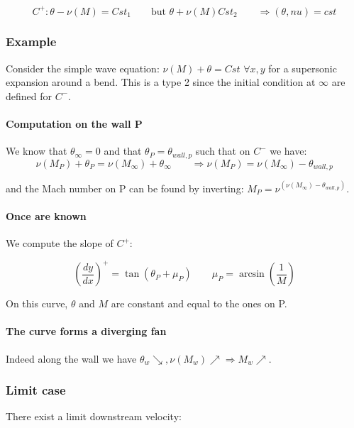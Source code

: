 	\begin{equation}
	C^+ : \theta - \nu (M) = {Cst}_1 \qquad \mbox{but } \theta + \nu(M) {Cst}_2\qquad \Rightarrow (\theta  , nu)= cst
	\end{equation}
	
\subsubsection{Example}
	Consider the simple wave equation: $\nu (M) +\theta = Cst$ $\forall x,y$ for a supersonic expansion around a bend. This is a type 2 since the initial condition at $\infty$ are defined for $C^-$. 
	
	\paragraph{Computation on the wall P}
	We know that $\theta _\infty = 0$ and that $\theta _P = \theta _{wall,p}$ such that on $C^-$ we have: 
	\ \\
	
	\begin{equation}
	\nu (M_P) + \theta _P = \nu (M_\infty) + \theta _\infty \qquad \Rightarrow \nu (M_P) = \nu (M_\infty) - \theta _{wall,p}
	\end{equation}
	
	and the Mach number on P can be found by inverting: $M_P = \nu ^(\nu (M_\infty) - \theta _{wall,p})$.
	
	\paragraph{Once  are known} We compute the slope of $C^+$: 
	
	\begin{equation}
	\left(\frac{dy}{dx} \right)^+ = \tan (\theta _P + \mu _P ) \qquad \mu _P = \arcsin \left( \frac{1}{M}\right)
	\end{equation}
	
	On this curve, $\theta$ and $M$ are constant and equal to the ones on P.
	
	\paragraph{The  curve forms a diverging fan} Indeed along the wall we have $\theta _w \searrow, \nu (M_w) \nearrow \Rightarrow M _w \nearrow$.
	
	\subsubsection{Limit case}
	There exist a limit downstream velocity: 
	
